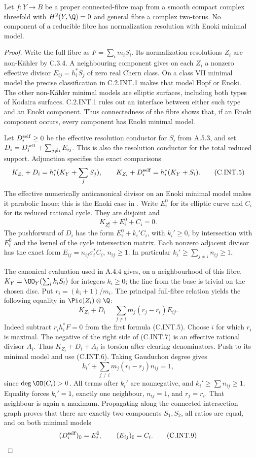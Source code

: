 \begin{lemma}
\label{st:C.2.INT.2}
Let $f:Y\to B$ be a proper connected-fibre map from a
smooth compact complex threefold with $H^2(Y,\Q)=0$
and general fibre a complex two-torus. No component
of a reducible fibre has normalization resolution
with Enoki minimal model.
\end{lemma}
\begin{proof}
Write the full fibre as $F=\sum_i m_iS_i$. Its
normalization resolutions $Z_i$ are non-K\"ahler by
C.3.4. A neighbouring component gives on each $Z_i$
a nonzero effective divisor $E_{ij}=h_i^*S_j$ of
zero real Chern class. On a class VII minimal model
the precise classification in C.2.INT.1 makes that
model Hopf or Enoki. The other non-K\"ahler minimal
models are elliptic surfaces, including both types
of Kodaira surfaces. C.2.INT.1 rules out an interface
between either such type and an Enoki component.
Thus connectedness of the fibre shows that, if an
Enoki component occurs, every component has Enoki
minimal model.

Let $D_i^{\rm self}\ge0$ be the effective resolution
conductor for $S_i$ from A.5.3, and set
$D_i=D_i^{\rm self}+\sum_{j\ne i}E_{ij}$. This is
also the resolution conductor for the total reduced
support. Adjunction specifies the exact comparisons
\[
 K_{Z_i}+D_i=h_i^*(K_Y+\sum_j S_j),\qquad
 K_{Z_i}+D_i^{\rm self}=h_i^*(K_Y+S_i).
 \tag{C.INT.5}
\]
The effective numerically anticanonical divisor on
an Enoki minimal model makes it parabolic Inoue;
this is the Enoki case in
\cite[Lemma~2.22 and the following paragraph]{Dloussky2006}.
Write $E_i^0$ for its elliptic curve and $C_i$ for
its reduced rational cycle. They are disjoint and
\[
 K_{Z_i^0}+E_i^0+C_i=0.
 \tag{C.INT.6}
\]
The pushforward of $D_i$ has the form
$E_i^0+k_i' C_i$, with $k_i'\ge0$, by intersection
with $E_i^0$ and the kernel of the cycle intersection
matrix. Each nonzero adjacent divisor has the exact
form $E_{ij}=n_{ij}\sigma_i^*C_i$, $n_{ij}\ge1$.
In particular $k_i'\ge\sum_{j\ne i}n_{ij}\ge1$.

The canonical evaluation used in A.4.4 gives, on a
neighbourhood of this fibre,
$K_Y=\OO_Y(\sum_i k_iS_i)$ for integers $k_i\ge0$;
the line from the base is trivial on the chosen disc.
Put $r_i=(k_i+1)/m_i$. The principal full-fibre
relation yields the following equality in
$\Pic(Z_i)\otimes\Q$:
\[
 K_{Z_i}+D_i
   =\sum_{j\ne i}m_j(r_j-r_i)E_{ij}.
 \tag{C.INT.7}
\]
Indeed subtract $r_i h_i^*F=0$ from the first
formula (C.INT.5). Choose $i$ for which $r_i$ is
maximal. The negative of the right side of
(C.INT.7) is an effective rational divisor $A_i$.
Thus $K_{Z_i}+D_i+A_i$ is torsion after clearing
denominators. Push to its minimal model and use
(C.INT.6). Taking Gauduchon degree gives
\[
 k_i'+\sum_{j\ne i}m_j(r_i-r_j)n_{ij}=1,
 \tag{C.INT.8}
\]
since $\deg\OO(C_i)>0$. All terms after $k_i'$
are nonnegative, and $k_i'\ge\sum n_{ij}\ge1$.
Equality forces $k_i'=1$, exactly one neighbour,
$n_{ij}=1$, and $r_j=r_i$. That neighbour is again
a maximum. Propagating along the connected
intersection graph proves that there are exactly
two components $S_1,S_2$, all ratios are equal,
and on both minimal models
\[
 (D_i^{\rm self})_0=E_i^0,
 \qquad (E_{ij})_0=C_i.
 \tag{C.INT.9}
\]


\end{proof}
